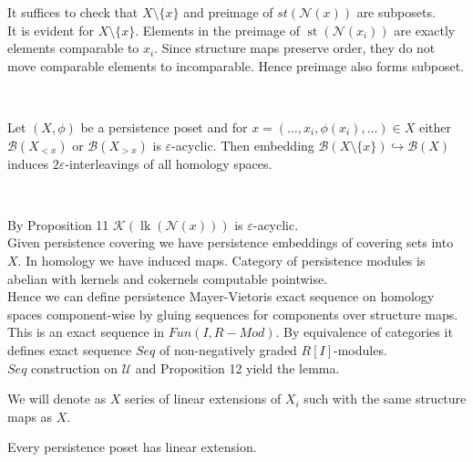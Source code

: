 \begin{pf}
  It suffices to check that $X \setminus \{x\}$ and preimage of $st(\mathcal{N}(x))$ are subposets.\\

  It is evident for $X \setminus \{x\}$. Elements in the preimage of $\operatorname{st}(\mathcal{N}(x_i))$ are exactly elements comparable to $x_i$. Since structure maps preserve order, they do not move comparable elements to incomparable. Hence preimage also forms subposet.
\end{pf}\\

\begin{lemma}
  Let $(X,\phi)$ be a persistence poset and for $x=(\ldots,x_i,\phi(x_i),\ldots) \in X$ either $\mathcal{B}(X_{< x})$ or $\mathcal{B}(X_{> x})$ is $\varepsilon$-acyclic. Then embedding $\mathcal{B}(X \setminus \{x\}) \hookrightarrow \mathcal{B}(X)$ induces $2\varepsilon$-interleavings of all homology spaces.
\end{lemma}

\begin{pf} ~ \par
  By Proposition 11 $\mathcal{K}(\operatorname{lk}(\mathcal{N}(x)))$ is $\varepsilon$-acyclic.\\

  Given persistence covering we have persistence embeddings of covering sets into $X$. In homology we have induced maps. Category of persistence modules is abelian with kernels and cokernels computable pointwise.\\

  Hence we can define persistence Mayer-Vietoris exact sequence on homology spaces component-wise by gluing sequences for components over structure maps. This is an exact sequence in $Fun(I,R-Mod)$. By equivalence of categories it defines exact sequence $Seq$ of non-negatively graded $R[I]$-modules.\\

  $Seq$ construction on $\mathcal{U}$ and Proposition 12 yield the lemma.
\end{pf}

\begin{definition}
  We will denote as  $X$ series of linear extensions of $X_i$ such with the same structure maps as $X$.
\end{definition}

\begin{proposition}
  Every persistence poset has linear extension.
\end{proposition}

